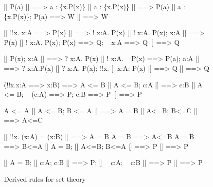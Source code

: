 \begin{figure} \underscoreon
\begin{ttbox}
        [| P(a) |] ==> a : \{x.P(x)\}
        [| a : \{x.P(x)\} |] ==> P(a)
        [| a : \{x.P(x)\};  P(a) ==> W |] ==> W

           [| !!x. x:A ==> P(x) |] ==> ! x:A. P(x)
           [| ! x:A. P(x);  x:A |] ==> P(x)
           [| ! x:A. P(x);  P(x) ==> Q;  ~ x:A ==> Q |] ==> Q

            [| P(x);  x:A |] ==> ? x:A. P(x)
           [| ! x:A. ~ P(x) ==> P(a);  a:A |] ==> ? x:A.P(x)
            [| ? x:A. P(x);  !!x. [| x:A; P(x) |] ==> Q  |] ==> Q

         (!!x.x:A ==> x:B) ==> A <= B
         [| A <= B;  c:A |] ==> c:B
        [| A <= B;  ~ (c:A) ==> P;  c:B ==> P |] ==> P

     A <= A
  [| A <= B;  B <= A |] ==> A = B
    [| A<=B;  B<=C |] ==> A<=C

         [| !!x. (x:A) = (x:B) |] ==> A = B
      A = B ==> A<=B
      A = B ==> B<=A
       [| A = B;  [| A<=B; B<=A |] ==> P |]  ==>  P

      [| A = B;  [| c:A; c:B |] ==> P;  
                           [| ~ c:A; ~ c:B |] ==> P 
                |]  ==>  P
\end{ttbox}
\caption{Derived rules for set theory} \label{hol-set1}
\end{figure}


